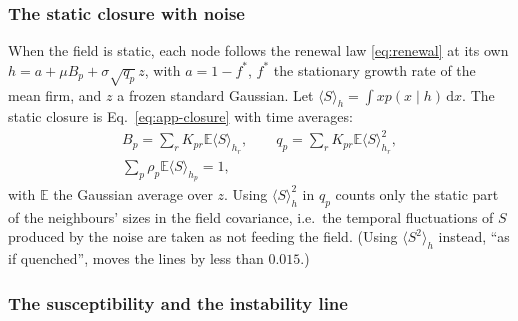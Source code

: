 \documentclass[pre,twocolumn,superscriptaddress,nofootinbib]{revtex4-2}
\newcommand{\E}{\mathbb E}
\newcommand{\dd}{\mathrm d}
\begin{document}
\subsubsection{The static closure with noise}

When the field is static, each node follows the renewal law \eqref{eq:renewal} at its own $h=a+\mu B_p+\sigma\sqrt{q_p}\,z$, with $a=1-f^*$, $f^*$ the stationary growth rate of the mean firm, and $z$ a frozen standard Gaussian.
Let $\langle S\rangle_h=\int xp(x\mid h)\,\dd x$.  The static closure is Eq.~\eqref{eq:app-closure} with time averages:
\begin{equation}
\begin{gathered}
B_p=\sum_rK_{pr}\E\langle S\rangle_{h_r},\qquad q_p=\sum_rK_{pr}\E\langle S\rangle_{h_r}^2,\\
\sum_p\rho_p\E\langle S\rangle_{h_p}=1,
\end{gathered}
\end{equation}
with $\E$ the Gaussian average over $z$.  Using $\langle S\rangle^2_h$ in $q_p$ counts only the static part of the neighbours'
sizes in the field covariance, i.e.\ the temporal fluctuations of $S$ produced by the noise are taken as not
feeding the field.  (Using $\langle S^2\rangle_h$ instead, ``as if quenched'', moves the lines by less than $0.015$.)

\subsubsection{The susceptibility and the instability line}
\label{app:susceptibility}
\end{document}
